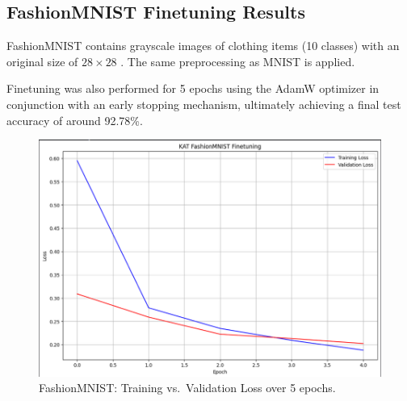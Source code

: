 \documentclass[conference]{IEEEtran}
\begin{document}
\subsection{FashionMNIST Finetuning Results}
FashionMNIST contains grayscale images of clothing items (10 classes) with an
original size of $28\times28$ \cite{fashionmnist}. The same preprocessing as
MNIST is applied.

Finetuning was also performed for 5 epochs using the AdamW optimizer in
conjunction with an early stopping mechanism, ultimately achieving a final test
accuracy of around 92.78\%. 

\begin{figure}[H]
    \centering
    \includegraphics[width=0.55\linewidth]{fashionmnist_train_loss.png}
    \caption{FashionMNIST: Training vs.\ Validation Loss over 5 epochs.}
    \label{fig:fashionmnist_loss}
\end{figure}
\end{document}
